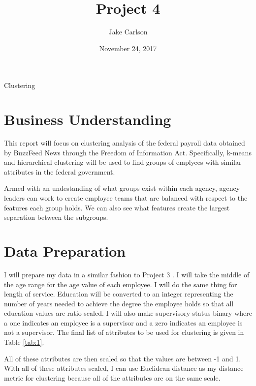 \documentclass{article}
\begin{document}
\title{Project 4}
\author{Jake Carlson}
\date{November 24, 2017}
\maketitle

\abstract
Clustering

\newpage

\tableofcontents
\newpage

\section{Business Understanding}
This report will focus on clustering analysis of the federal payroll data obtained by BuzzFeed News through the Freedom of Information Act. Specifically, k-means and hierarchical clustering will be used to find groups of emplyees with similar attributes in the federal government.
\par
Armed with an undestanding of what groups exist within each agency, agency leaders can work to create employee teams that are balanced with respect to the features each group holds. We can also see what features create the largest separation between the subgroups.

\section{Data Preparation}
I will prepare my data in a similar fashion to Project 3 \cite{proj3}. I will take the middle of the age range for the age value of each employee. I will do the same thing for length of service. Education will be converted to an integer representing the number of years needed to achieve the degree the employee holds so that all education values are ratio scaled. I will also make supervisory status binary where a one indicates an employee is a supervisor and a zero indicates an employee is not a supervisor. The final list of attributes to be used for clustering is given in Table \ref{tab:1}.
\par
All of these attributes are then scaled so that the values are between -1 and 1. With all of these attributes scaled, I can use Euclidean distance as my distance metric for clustering because all of the attributes are on the same scale.
\end{document}

